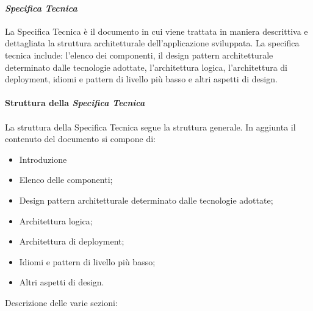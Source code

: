 \paragraph{\textit{Specifica Tecnica}}
La Specifica Tecnica è il documento in cui viene trattata in maniera descrittiva e dettagliata la struttura architetturale dell'applicazione sviluppata. 
La specifica tecnica include: l'elenco dei componenti, il design pattern architetturale determinato dalle tecnologie adottate, l'architettura logica, l'architettura di deployment, idiomi e pattern di livello più basso e altri aspetti di design.
\\\\
\textbf{Struttura della \textit{Specifica Tecnica}}
\\\\
La struttura della Specifica Tecnica segue la struttura generale.
In aggiunta il contenuto del documento si compone di:
\begin{itemize}
	\item Introduzione
    \item Elenco delle componenti;
    \item Design pattern architetturale determinato dalle tecnologie adottate;
    \item Architettura logica;
	\item Architettura di deployment;
	\item Idiomi e pattern di livello più basso;
	\item Altri aspetti di design.
\end{itemize}
\noindent Descrizione delle varie sezioni:
